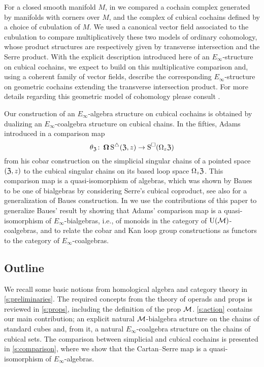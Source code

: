 For a closed smooth manifold $M$, in \cite{medina2021flowing} we compared a cochain complex generated by manifolds with corners over $M$, and the complex of cubical cochains defined by a choice of cubulation of $M$.
We used a canonical vector field associated to the cubulation to compare multiplicatively these two models of ordinary cohomology, whose product structures are respectively given by transverse intersection and the Serre product.
With the explicit description introduced here of an $E_\infty$-structure on cubical cochains, we expect to build on this multiplicative comparison and, using a coherent family of vector fields, describe the corresponding $E_\infty$-structure on geometric cochains extending the transverse intersection product.
For more details regarding this geometric model of cohomology please consult \cite{medina2022foundations}.

Our construction of an $E_\infty$-algebra structure on cubical cochains is obtained by dualizing an $E_\infty$-coalgebra structure on cubical chains.
In the fifties, Adams introduced in \cite{adams1956cobar} a comparison map
\[
\theta_{\mathfrak{Z}} \colon \operatorname{\mathbf{\Omega}} \operatorname{\operatorname{S}^{\triangle}}(\mathfrak{Z},z) \to \operatorname{\operatorname{S}^{\square}}(\Omega_z \mathfrak{Z})
\]
from his cobar construction on the simplicial singular chains of a pointed space $(\mathfrak{Z},z)$ to the cubical singular chains on its based loop space $\Omega_z \mathfrak{Z}$.
This comparison map is a quasi-isomorphism of algebras, which was shown by Baues \cite{baues1998hopf} to be one of bialgebras by considering Serre's cubical coproduct, see also \cite{galvez-carrilo202hopf1} for a generalization of Baues construction.
In \cite{medina2021cobar} we use the contributions of this paper to generalize Baues' result by showing that Adams' comparison map is a quasi-isomorphism of $E_\infty$-bialgebras, i.e., of monoids in the category of ${\operatorname{U}(\mathcal{M})}$-coalgebras, and to relate the cobar and Kan loop group constructions as functors to the category of $E_\infty$-coalgebras.

\subsection*{Outline}

We recall some basic notions from homological algebra and category theory in \cref{s:preliminaries}.
The required concepts from the theory of operads and props is reviewed in \cref{s:props}, including the definition of the prop $\mathcal{M}$.
\cref{s:action} contains our main contribution; an explicit natural $\mathcal{M}$-bialgebra structure on the chains of standard cubes and, from it, a natural $E_\infty$-coalgebra structure on the chains of cubical sets.
The comparison between simplicial and cubical cochains is presented in \cref{s:comparison}, where we show that the Cartan--Serre map is a quasi-isomorphism of $E_\infty$-algebras.